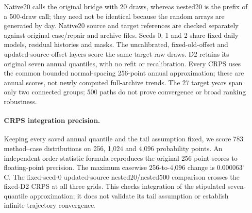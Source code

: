 Native20 calls the original bridge with 20 draws, whereas nested20 is the prefix of a 500-draw call; they need not be identical because the random arrays are generated by day. Native20 source and target references are checked separately against original case/repair and archive files. Seeds 0, 1 and 2 share fixed daily models, residual histories and masks. The uncalibrated, fixed-old-offset and updated-source-offset layers score the same target raw draws. D2 retains its original seven annual quantiles, with no refit or recalibration. Every CRPS uses the common bounded normal-spacing 256-point annual approximation; these are annual scores, not newly computed full-archive trends. The 27 target years span only two connected groups; 500 paths do not prove convergence or broad ranking robustness.



\paragraph{CRPS integration precision.} Keeping every saved annual quantile and the tail assumption fixed, we score 783 method--case distributions on 256, 1,024 and 4,096 probability points. An independent order-statistic formula reproduces the original 256-point scores to floating-point precision. The maximum casewise 256-to-4,096 change is 0.000063$^{\circ}$C. The fixed-seed-0 updated-source nested20/nested500 comparison crosses the fixed-D2 CRPS at all three grids. This checks integration of the stipulated seven-quantile approximation; it does not validate its tail assumption or establish infinite-trajectory convergence.

